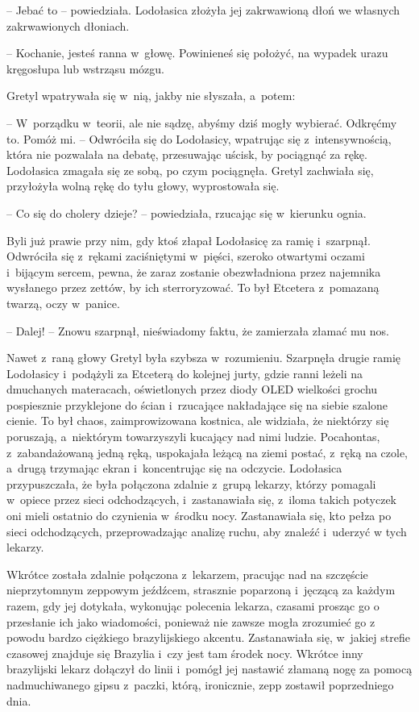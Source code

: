 \documentclass[oneside,polish,11pt,sfheadings]{mwbk}
\begin{document}
-- Jebać to -- powiedziała. Lodołasica złożyła jej zakrwawioną dłoń we własnych
zakrwawionych dłoniach.

-- Kochanie, jesteś ranna w~głowę. Powinieneś się położyć, na wypadek
urazu kręgosłupa lub wstrząsu mózgu.

Gretyl wpatrywała się w~nią, jakby nie słyszała, a~potem: 

-- W~porządku w~teorii, ale nie sądzę, abyśmy dziś mogły wybierać. Odkręćmy to. Pomóż
mi. -- Odwróciła się do Lodołasicy, wpatrując się z~intensywnością, która
nie pozwalała na debatę, przesuwając uścisk, by pociągnąć za rękę.
Lodołasica zmagała się ze sobą, po czym pociągnęła. Gretyl zachwiała
się, przyłożyła wolną rękę do tyłu głowy, wyprostowała się.

-- Co się do cholery dzieje? -- powiedziała, rzucając się w~kierunku
ognia.

Byli już prawie przy nim, gdy ktoś złapał Lodołasicę za ramię i~szarpnął. Odwróciła się z~rękami zaciśniętymi w~pięści, szeroko
otwartymi oczami i~bijącym sercem, pewna, że zaraz zostanie
obezwładniona przez najemnika wysłanego przez zettów, by ich
sterroryzować. To był Etcetera z~pomazaną twarzą, oczy w~panice. 

-- Dalej! -- Znowu szarpnął, nieświadomy faktu, że zamierzała złamać mu nos.

Nawet z~raną głowy Gretyl była szybsza w~rozumieniu. Szarpnęła drugie
ramię Lodołasicy i~podążyli za Etceterą do kolejnej jurty, gdzie ranni
leżeli na dmuchanych materacach, oświetlonych przez diody OLED wielkości
grochu pospiesznie przyklejone do ścian i~rzucające nakładające się na
siebie szalone cienie. To był chaos, zaimprowizowana kostnica, ale
widziała, że niektórzy się poruszają, a~niektórym towarzyszyli kucający
nad nimi ludzie. Pocahontas, z~zabandażowaną jedną ręką, uspokajała
leżącą na ziemi postać, z~ręką na czole, a~drugą trzymając ekran i~koncentrując się na odczycie. Lodołasica przypuszczała, że była
połączona zdalnie z~grupą lekarzy, którzy pomagali w~opiece przez sieci
odchodzących, i~zastanawiała się, z~iloma takich potyczek oni mieli
ostatnio do czynienia w~środku nocy. Zastanawiała się, kto pełza po
sieci odchodzących, przeprowadzając analizę ruchu, aby znaleźć i~uderzyć
w tych lekarzy.

Wkrótce została zdalnie połączona z~lekarzem, pracując nad na szczęście
nieprzytomnym zeppowym jeźdźcem, strasznie poparzoną i~jęczącą za każdym
razem, gdy jej dotykała, wykonując polecenia lekarza, czasami prosząc go
o przesłanie ich jako wiadomości, ponieważ nie zawsze mogła zrozumieć go
z powodu bardzo ciężkiego brazylijskiego akcentu. Zastanawiała się, w~jakiej strefie czasowej znajduje się Brazylia i~czy jest tam środek
nocy. Wkrótce inny brazylijski lekarz dołączył do linii i~pomógł jej
nastawić złamaną nogę za pomocą nadmuchiwanego gipsu z~paczki, którą,
ironicznie, zepp zostawił poprzedniego dnia.
\end{document}
